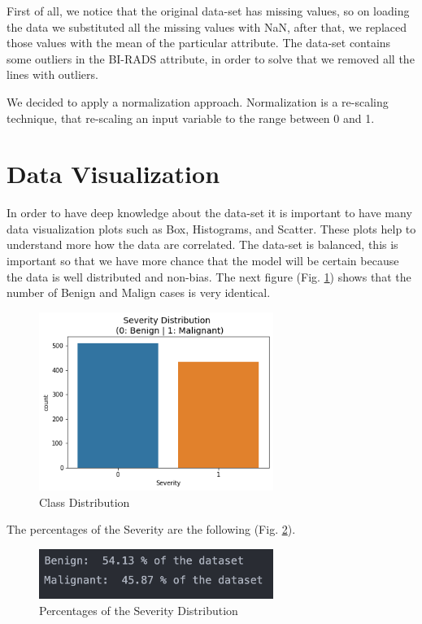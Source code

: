 \documentclass[conference]{IEEEtran}
\begin{document}
First of all, we notice that the original data-set has missing values, so on loading the data we substituted all the missing values with NaN, after that, we replaced those values with the mean of the particular attribute. The data-set contains some outliers in the BI-RADS attribute, in order to solve that we removed all the lines with outliers.

We decided to apply a normalization approach. Normalization is a re-scaling technique, that re-scaling an input variable to the range between 0 and 1.

\section{Data Visualization}

In order to have deep knowledge about the data-set it is important to have many data visualization plots such as Box, Histograms, and Scatter. These plots help to understand more how the data are correlated.
The data-set is balanced, this is important so that we have more chance that the model will be certain because the data is well distributed and non-bias. The next figure (Fig. \ref{img:severity_distribution}) shows that the number of Benign and Malign cases is very identical.

\begin{figure}[!h]
    \centering
    \includegraphics[width=3.0in]{severity_distribution.png}
    \caption{Class Distribution}
    \label{img:severity_distribution}
\end{figure}

The percentages of the Severity are the following (Fig. \ref{img:perc_dist.png}).
\begin{figure}[!h]
    \centering
    \includegraphics[width=3.0in]{perc_dist.png}
    \caption{Percentages of the Severity Distribution}
    \label{img:perc_dist.png}
\end{figure}
\end{document}
